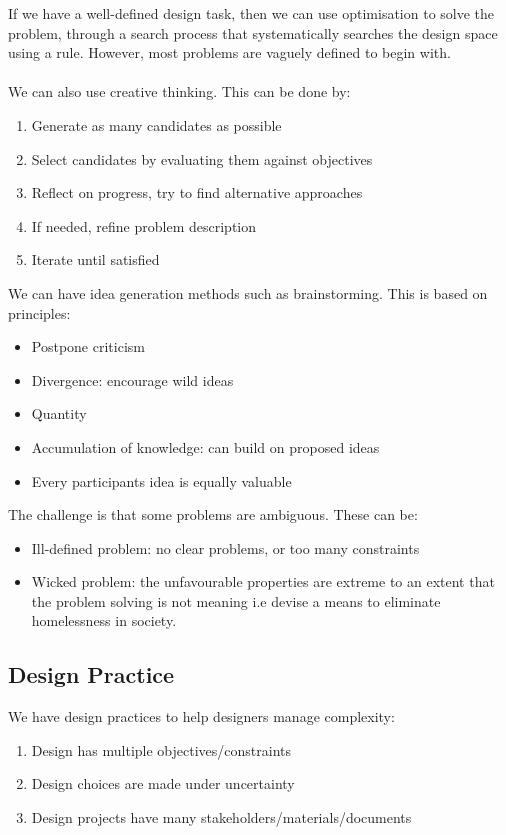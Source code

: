 \documentclass{article}
\begin{document}
If we have a well-defined design task, then we can use optimisation to solve the problem, through a search process that systematically searches the design space using a rule. However, most problems are vaguely defined to begin with. \\ \\
We can also use creative thinking. This can be done by:
\begin{enumerate}
    \item Generate as many candidates as possible
    \item Select candidates by evaluating them against objectives
    \item Reflect on progress, try to find alternative approaches
    \item If needed, refine problem description
    \item Iterate until satisfied
\end{enumerate}
We can have idea generation methods such as brainstorming. This is based on principles:
\begin{itemize}
    \item Postpone criticism
    \item Divergence: encourage wild ideas
    \item Quantity
    \item Accumulation of knowledge: can build on proposed ideas
    \item Every participants idea is equally valuable
\end{itemize}
The challenge is that some problems are ambiguous. These can be:
\begin{itemize}
    \item Ill-defined problem: no clear problems, or too many constraints
    \item Wicked problem: the unfavourable properties are extreme to an extent that the problem solving is not meaning i.e devise a means to eliminate homelessness in society.
\end{itemize}
\subsection{Design Practice}
We have design practices to help designers manage complexity:
\begin{enumerate}
    \item Design has multiple objectives/constraints
    \item Design choices are made under uncertainty
    \item Design projects have many stakeholders/materials/documents
\end{enumerate}
\end{document}
